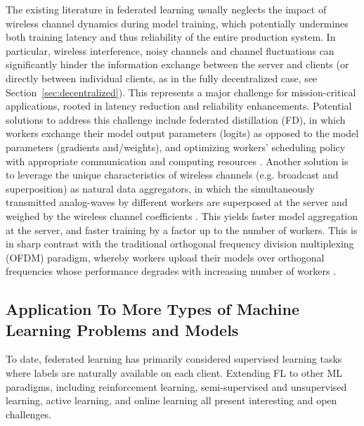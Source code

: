 \documentclass[11pt]{article}
\begin{document}
The existing literature in federated learning usually neglects the impact of wireless channel dynamics during model training, which potentially undermines both training latency and thus reliability of the entire production system. In particular, wireless interference, noisy channels and channel fluctuations can significantly hinder the information exchange between the server and clients (or directly between individual clients, as in the fully decentralized case, see Section~\ref{sec:decentralized}). This represents a major challenge for mission-critical applications, rooted in latency reduction and reliability enhancements. Potential solutions to address this challenge include federated distillation (FD), in which workers exchange their model output parameters (logits) as opposed to the model parameters (gradients and/weights),  and optimizing workers' scheduling policy with appropriate communication and computing resources \citep{FD, EdgeML, FL5G}. Another solution is to leverage the unique characteristics of wireless channels (e.g. broadcast and superposition) as natural data aggregators, in which the simultaneously transmitted  analog-waves  by different workers are  superposed at the server and weighed by the wireless channel coefficients \citep{AbariRK16}. This yields faster model aggregation at the server, and faster training by a factor up to the number of workers. This is in sharp contrast with the traditional orthogonal frequency division  multiplexing (OFDM) paradigm, whereby workers upload their models over orthogonal frequencies whose performance degrades with increasing number of workers \cite{elgabli2020harnessing}.


\subsection{Application To More Types of Machine Learning Problems and Models}\label{sec:more_types_ml}
To date, federated learning has primarily considered supervised learning tasks where labels are naturally available on each client. Extending FL to other ML paradigms, including reinforcement learning, semi-supervised and unsupervised learning, active learning, and online learning \citep{he2019central,zhao2019decentralized} all present interesting and open challenges.
\end{document}
